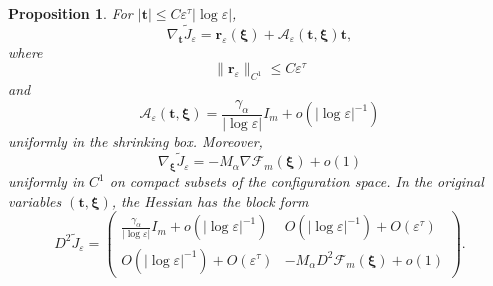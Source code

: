 \documentclass[11pt]{article}
\newtheorem{proposition}[theorem]{Proposition}
\numberwithin{equation}{section}
\begin{document}
\begin{proposition}\label{prop:reduced-equations}
For
$|\boldsymbol t|\leq C\varepsilon^\tau|\log\varepsilon|$,
\begin{equation}\label{eq:reduced-scale-equation}
\nabla_{\boldsymbol t}\widetilde J_\varepsilon
=\boldsymbol r_\varepsilon(\boldsymbol\xi)
+\mathcal A_\varepsilon(\boldsymbol t,\boldsymbol\xi)
\boldsymbol t,
\end{equation}
where
\begin{equation}\label{eq:scale-remainder}
\|\boldsymbol r_\varepsilon\|_{C^1}
\leq C\varepsilon^\tau
\end{equation}
and
\begin{equation}\label{eq:scale-matrix-uniform}
\mathcal A_\varepsilon(\boldsymbol t,\boldsymbol\xi)
=\frac{\gamma_\alpha}{|\log\varepsilon|}I_m
+o(|\log\varepsilon|^{-1})
\end{equation}
uniformly in the shrinking box. Moreover,
\begin{equation}\label{eq:reduced-position-equation}
\nabla_{\boldsymbol\xi}\widetilde J_\varepsilon
=-M_\alpha\nabla\mathcal F_m(\boldsymbol\xi)+o(1)
\end{equation}
uniformly in $C^1$ on compact subsets of the configuration space.
In the original variables
$(\boldsymbol t,\boldsymbol\xi)$, the Hessian has the block form
\begin{equation}\label{eq:reduced-Hessian-block}
D^2\widetilde J_\varepsilon
=\begin{pmatrix}
\displaystyle\frac{\gamma_\alpha}{|\log\varepsilon|}I_m
+o(|\log\varepsilon|^{-1})
& O(|\log\varepsilon|^{-1})+O(\varepsilon^\tau)\\[1.5ex]
O(|\log\varepsilon|^{-1})+O(\varepsilon^\tau)
&-M_\alpha D^2\mathcal F_m(\boldsymbol\xi)+o(1)
\end{pmatrix}.
\end{equation}
\end{proposition}
\end{document}
